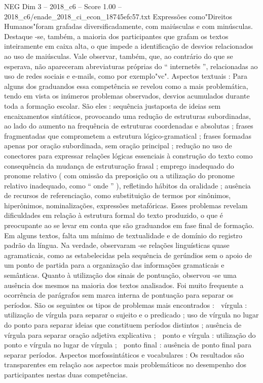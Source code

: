 \begin{textsample}{NEG Dim 3 – 2018\_c6 – Score 1.00 – 2018\_c6/enade\_2018\_ci\_econ\_18745efc57.txt}
Expressões como"Direitos Humanos"foram grafadas diversificadamente, com maiúsculas e com minúsculas.
Destaque -se, também, a maioria dos participantes que grafam os textos inteiramente em caixa alta, o que impede a identificação de desvios relacionados ao uso de maiúsculas.
Vale observar, também, que, ao contrário do que se esperava, não apareceram abreviaturas próprias do “ internetês ”, relacionadas ao uso de redes sociais e e-mails, como por exemplo"vc".
Aspectos textuais : Para alguns dos graduandos essa competência se revelou como a mais problemática, tendo em vista os inúmeros problemas observados, desvios acumulados durante toda a formação escolar.
São eles : sequência justaposta de ideias sem encaixamentos sintáticos, provocando uma redução de estruturas subordinadas, ao lado do aumento na frequência de estruturas coordenadas e absolutas ; frases fragmentadas que comprometem a estrutura lógico-gramatical ; frases formadas apenas por oração subordinada, sem oração principal ; redução no uso de conectores para expressar relações lógicas essenciais à construção do texto como consequência da mudança de estruturação frasal ; emprego inadequado do pronome relativo ( com omissão da preposição ou a utilização do pronome relativo inadequado, como “ onde ” ), refletindo hábitos da oralidade ; ausência de recursos de referenciação, como substituição de termos por sinônimos, hiperônimos, nominalizações, expressões metafóricas.
Esses problemas revelam dificuldades em relação à estrutura formal do texto produzido, o que é preocupante ao se levar em conta que são graduandos em fase final de formação.
Em alguns textos, falta um mínimo de textualidade e de domínio do registro padrão da língua.
Na verdade, observaram -se relações linguísticas quase agramaticais, como as estabelecidas pela sequência de gerúndios sem o apoio de um ponto de partida para a organização das informações gramaticais e semânticas.
Quanto à utilização dos sinais de pontuação, observou -se uma ausência dos mesmos na maioria dos textos analisados.
Foi muito frequente a ocorrência de parágrafos sem marca interna de pontuação para separar os períodos.
São os seguintes os tipos de problemas mais encontrados :  vírgula : utilização de vírgula para separar o sujeito e o predicado ; uso de vírgula no lugar do ponto para separar ideias que constituem períodos distintos ; ausência de vírgula para separar oração adjetiva explicativa ;  ponto e vírgula : utilização do ponto e vírgula no lugar de vírgula ;  ponto final : ausência de ponto final para separar períodos.
Aspectos morfossintáticos e vocabulares : Os resultados são transparentes em relação aos aspectos mais problemáticos no desempenho dos participantes nestas duas competências.

\end{textsample}
